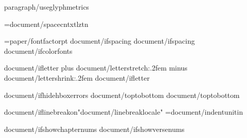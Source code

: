 \def\LineSpaceBase{{{paragraph/linespacebase}}}
\def\LineSpacingFactor{{{paragraph/linespacingfactor}}}
\def\VerticalSpaceFactor{{1.0}}
{paragraph/useglyphmetrics}

\XeTeXinterwordspaceshaping={document/spacecntxtlztn}

\FontSizeUnit={paper/fontfactor}pt
\def\regular{{"{document/fontregular}{document/script}"}}
\def\bold{{"{document/fontbold}{document/script}"}}
\def\italic{{"{document/fontitalic}{document/script}"}}
\def\bolditalic{{"{document/fontbolditalic}{document/script}"}}
{document/ifspacing}\def\SpaceStretchFactor{{{document/spacestretch}}}
{document/ifspacing}\def\SpaceShrinkFactor{{{document/spaceshrink}}}
{document/ifcolorfonts}\ColorFontsfalse

\def\UnderlineThickness{{{document/underlinethickness}em}}
\def\UnderlineLower{{{document/underlineposition}em}}


{document/ifletter}\newskip\intercharskip \intercharskip=0pt plus {document/letterstretch:.2f}em minus {document/lettershrink:.2f}em
{document/ifletter}\def\intercharspace{{\leavevmode\nobreak\hskip\intercharskip}}


{document/ifhidehboxerrors}\overfullrule=0pt
{document/toptobottom}     %
{document/toptobottom}\rotatetrue

{document/iflinebreakon}\XeTeXlinebreaklocale "{document/linebreaklocale}"
\IndentUnit={document/indentunit}in

{document/ifshowchapternums}\OmitChapterNumbertrue
\def\AfterChapterSpaceFactor{{{document/afterchapterspace}}}
{document/ifshowversenums}\def\AfterVerseSpaceFactor{{{document/afterversespace}}}

